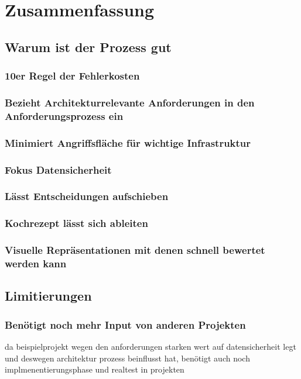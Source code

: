 \chapter{Zusammenfassung}

\section{Warum ist der Prozess gut}
\subsection{10er Regel der Fehlerkosten}
\subsection{Bezieht Architekturrelevante Anforderungen in den Anforderungsprozess ein}
\subsection{Minimiert Angriffsfläche für wichtige Infrastruktur}
\subsection{Fokus Datensicherheit}
\subsection{Lässt Entscheidungen aufschieben}
\subsection{Kochrezept lässt sich ableiten}
\subsection{Visuelle Repräsentationen mit denen schnell bewertet werden kann}

\section{Limitierungen}
\subsection{Benötigt noch mehr Input von anderen Projekten}
da beispielprojekt wegen den anforderungen starken wert auf datensicherheit legt und deswegen architektur prozess beinflusst hat, benötigt auch noch implmenentierungsphase und realtest in projekten

